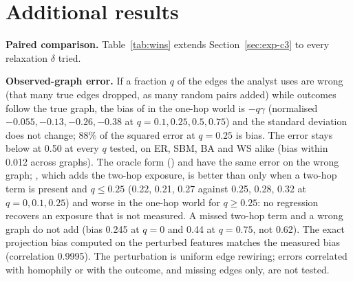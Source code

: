 \section{Additional results}\label{app:results}
\textbf{Paired comparison.}
Table~\ref{tab:wins} extends Section~\ref{sec:exp-c3} to every relaxation $\delta$ tried.
\begin{table}[h]
\caption{Paired comparison of  with each competitor over 100 (response, $p$, $d$) combinations on the same draws. A win is a 95\% paired-bootstrap interval of the RMSE difference below zero, a loss above zero. ``Declared'' $\delta$ is the smallest on the grid with at least 50 expected exposed units per arm; ``oracle'' $\delta$ is the best in each cell and uses the truth.}
\label{tab:wins}
\centering

\end{table}

\textbf{Observed-graph error.}
If a fraction $q$ of the edges the analyst uses are wrong (that many true edges dropped, as many random pairs added) while outcomes follow the true graph, the bias of  in the one-hop world is $-q\gamma$ (normalised $-0.055,-0.13,-0.26,-0.38$ at $q=0.1,0.25,0.5,0.75$) and the standard deviation does not change; 88\% of the squared error at $q=0.25$ is bias. The error stays below  at 0.50 at every $q$ tested, on ER, SBM, BA and WS alike (bias within 0.012 across graphs). The oracle form () and  have the same error on the wrong graph; , which adds the two-hop exposure, is better than  only when a two-hop term is present and $q\le0.25$ (0.22, 0.21, 0.27 against 0.25, 0.28, 0.32 at $q=0,0.1,0.25$) and worse in the one-hop world for $q\ge0.25$: no regression recovers an exposure that is not measured. A missed two-hop term and a wrong graph do not add (bias 0.245 at $q=0$ and 0.44 at $q=0.75$, not 0.62). The exact projection bias computed on the perturbed features matches the measured bias (correlation 0.9995). The perturbation is uniform edge rewiring; errors correlated with homophily or with the outcome, and missing edges only, are not tested.

